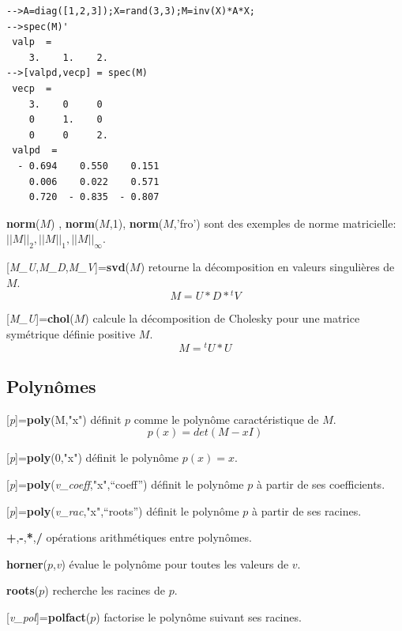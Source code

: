 \documentclass{article}
\begin{document}
\begin{multicols}{3}
\begin{description}
\begin{verbatim}
-->A=diag([1,2,3]);X=rand(3,3);M=inv(X)*A*X;
-->spec(M)'
 valp  =
    3.    1.    2.  
-->[valpd,vecp] = spec(M)
 vecp  =
    3.    0     0   
    0     1.    0   
    0     0     2.  
 valpd  =
  - 0.694    0.550    0.151  
    0.006    0.022    0.571  
    0.720  - 0.835  - 0.807
\end{verbatim}
\item{\textbf{norm}($M$) , \textbf{norm}($M$,1), \textbf{norm}($M$,'fro')} sont des exemples de norme matricielle: $||M||_{2},||M||_{1},||M||_{\infty}$.
\item{[\textit{M\_U},\textit{M\_D},\textit{M\_V}]=\textbf{svd}($M$)} retourne la décomposition en valeurs singulières de $M$.
$$M = U * D * {}^{t}V$$
\item{[\textit{M\_U}]=\textbf{chol}($M$)} calcule la décomposition de Cholesky pour une matrice symétrique définie positive $M$.
$$M = {}^{t}U * U$$
\end{description}

\subsection*{Polynômes}
\begin{description}
\item{[\textit{p}]=\textbf{poly}(M,"x")} définit $p$ comme le polynôme caractéristique de $M$.
$$p(x) = det(M - xI)$$
\item{[\textit{p}]=\textbf{poly}(0,"x")} définit le polynôme $p(x)=x$.
\item{[\textit{p}]=\textbf{poly}(\textit{v\_coeff},"x",``coeff'')} définit le polynôme $p$ à partir de ses coefficients.
\item{[\textit{p}]=\textbf{poly}(\textit{v\_rac},"x",``roots'')} définit le polynôme $p$ à partir de ses racines.
\item{\textbf{+},\textbf{-},\textbf{*},\textbf{/}} opérations arithmétiques entre polynômes.
\item{\textbf{horner}($p$,\textit{v})} évalue le polynôme pour toutes les valeurs de $v$.
\item{\textbf{roots}($p$)} recherche les racines de $p$.
\item{[\textit{v\_pol}]=\textbf{polfact}($p$)} factorise le polynôme suivant ses racines.
\end{description}




\end{multicols}
\end{document}
